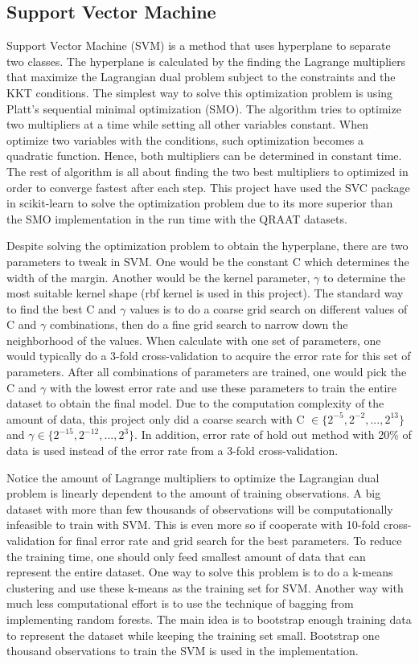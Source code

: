 \documentclass[twoside]{article}
\begin{document}
\subsection{Support Vector Machine}
Support Vector Machine (SVM) is a method that uses hyperplane to separate two classes. The hyperplane is calculated by the finding the Lagrange multipliers that maximize the Lagrangian dual problem subject to the constraints and the KKT conditions. The simplest way to solve this optimization problem is using Platt's sequential minimal optimization (SMO). The algorithm tries to optimize two multipliers at a time while setting all other variables constant. When optimize two variables with the conditions, such optimization becomes a quadratic function. Hence, both multipliers can be determined in constant time. The rest of algorithm is all about finding the two best multipliers to optimized in order to converge fastest after each step. This project have used the SVC package in scikit-learn to solve the optimization problem due to its more superior than the SMO implementation in the run time with the QRAAT datasets.

Despite solving the optimization problem to obtain the hyperplane, there are two parameters to tweak in SVM. One would be the constant C which determines the width of the margin. Another would be the kernel parameter, $\gamma$ to determine the most suitable kernel shape (rbf kernel is used in this project). The standard way to find the best C and $\gamma$ values is to do a coarse grid search on different values of C and $\gamma$ combinations, then do a fine grid search to narrow down the neighborhood of the values. When calculate with one set of parameters, one would typically do a 3-fold cross-validation to acquire the error rate for this set of parameters. After all combinations of parameters are trained, one would pick the C and $\gamma$ with the lowest error rate and use these parameters to train the entire dataset to obtain the final model. Due to the computation complexity of the amount of data, this project only did a coarse search with C $\in \{2^{-5},2^{-2},...,2^{13}\}$ and $\gamma \in \{2^{-15}, 2^{-12},...,2^{3}\}$. In addition, error rate of hold out method with 20\% of data is used instead of the error rate from a 3-fold cross-validation.

Notice the amount of Lagrange multipliers to optimize the Lagrangian dual problem is linearly dependent to the amount of training observations. A big dataset with more than few thousands of observations will be computationally infeasible to train with SVM. This is even more so if cooperate with 10-fold cross-validation for final error rate and grid search for the best parameters. To reduce the training time, one should only feed smallest amount of data that can represent the entire dataset. One way to solve this problem is to do a k-means clustering and use these k-means as the training set for SVM. Another way with much less computational effort is to use the technique of bagging from implementing random forests. The main idea is to bootstrap enough training data to represent the dataset while keeping the training set small. Bootstrap one thousand observations to train the SVM is used in the implementation.
\end{document}
